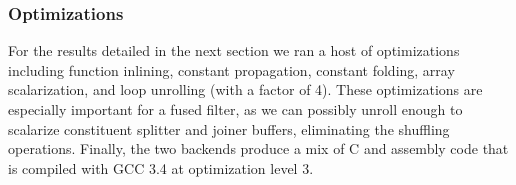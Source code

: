 \subsubsection{Optimizations}

For the results detailed in the next section we ran a host of
optimizations including function inlining, constant propagation,
constant folding, array scalarization, and loop unrolling (with a
factor of 4).  These optimizations are especially important for a
fused filter, as we can possibly unroll enough to scalarize
constituent splitter and joiner buffers, eliminating the shuffling
operations.  Finally, the two backends produce a mix of C and assembly
code that is compiled with GCC 3.4 at optimization level 3.
